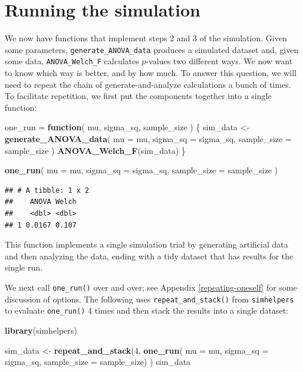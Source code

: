 \documentclass[
]{book}
\newenvironment{Shaded}{\begin{snugshade}}{\end{snugshade}}
\newcommand{\AttributeTok}[1]{\textcolor[rgb]{0.13,0.29,0.53}{#1}}
\newcommand{\ControlFlowTok}[1]{\textcolor[rgb]{0.13,0.29,0.53}{\textbf{#1}}}
\newcommand{\DecValTok}[1]{\textcolor[rgb]{0.00,0.00,0.81}{#1}}
\newcommand{\FunctionTok}[1]{\textcolor[rgb]{0.13,0.29,0.53}{\textbf{#1}}}
\newcommand{\NormalTok}[1]{#1}
\newcommand{\OtherTok}[1]{\textcolor[rgb]{0.56,0.35,0.01}{#1}}
\begin{document}
\section{Running the simulation}\label{running-the-simulation}

We now have functions that implement steps 2 and 3 of the simulation.
Given some parameters, \texttt{generate\_ANOVA\_data} produces a simulated dataset and, given some data, \texttt{ANOVA\_Welch\_F} calculates \(p\)-values two different ways.
We now want to know which way is better, and by how much.
To answer this question, we will need to repeat the chain of generate-and-analyze calculations a bunch of times.
To facilitate repetition, we first put the components together into a single function:

\begin{Shaded}
\begin{Highlighting}[]
\NormalTok{one\_run }\OtherTok{=} \ControlFlowTok{function}\NormalTok{( mu, sigma\_sq, sample\_size ) \{}
\NormalTok{  sim\_data }\OtherTok{\textless{}{-}} \FunctionTok{generate\_ANOVA\_data}\NormalTok{( }\AttributeTok{mu =}\NormalTok{ mu, }\AttributeTok{sigma\_sq =}\NormalTok{ sigma\_sq, }\AttributeTok{sample\_size =}\NormalTok{ sample\_size )}
  \FunctionTok{ANOVA\_Welch\_F}\NormalTok{(sim\_data)}
\NormalTok{\}}

\FunctionTok{one\_run}\NormalTok{( }\AttributeTok{mu =}\NormalTok{ mu, }\AttributeTok{sigma\_sq =}\NormalTok{ sigma\_sq, }\AttributeTok{sample\_size =}\NormalTok{ sample\_size )}
\end{Highlighting}
\end{Shaded}

\begin{verbatim}
## # A tibble: 1 x 2
##    ANOVA Welch
##    <dbl> <dbl>
## 1 0.0167 0.107
\end{verbatim}

This function implements a single simulation trial by generating artificial data and then analyzing the data, ending with a tidy dataset that has results for the single run.

We next call \texttt{one\_run()} over and over; see Appendix \ref{repeating-oneself} for some discussion of options.
The following uses \texttt{repeat\_and\_stack()} from \texttt{simhelpers} to evaluate \texttt{one\_run()} 4 times and then stack the results into a single dataset:

\begin{Shaded}
\begin{Highlighting}[]
\FunctionTok{library}\NormalTok{(simhelpers)}

\NormalTok{sim\_data }\OtherTok{\textless{}{-}} \FunctionTok{repeat\_and\_stack}\NormalTok{(}\DecValTok{4}\NormalTok{, }
  \FunctionTok{one\_run}\NormalTok{( }\AttributeTok{mu =}\NormalTok{ mu, }\AttributeTok{sigma\_sq =}\NormalTok{ sigma\_sq, }\AttributeTok{sample\_size =}\NormalTok{ sample\_size)}
\NormalTok{)}
\NormalTok{sim\_data}
\end{Highlighting}
\end{Shaded}
\end{document}

